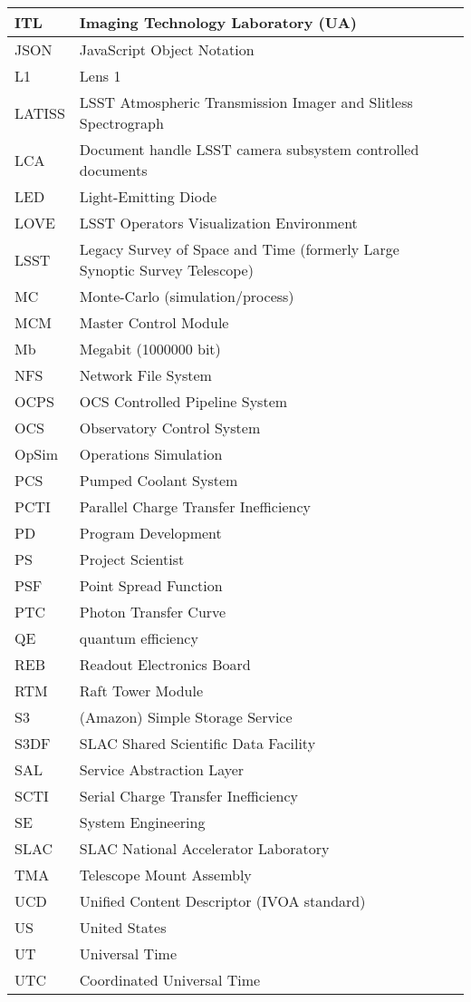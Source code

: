 \begin{longtable}{p{}p{}}
ITL & Imaging Technology Laboratory (UA) \\\hline
JSON & JavaScript Object Notation \\\hline
L1 & Lens 1 \\\hline
LATISS & LSST Atmospheric Transmission Imager and Slitless Spectrograph \\\hline
LCA & Document handle LSST camera subsystem controlled documents \\\hline
LED & Light-Emitting Diode \\\hline
LOVE & LSST Operators Visualization Environment \\\hline
LSST & Legacy Survey of Space and Time (formerly Large Synoptic Survey Telescope) \\\hline
MC & Monte-Carlo (simulation/process) \\\hline
MCM & Master Control Module \\\hline
Mb & Megabit (1000000 bit) \\\hline
NFS & Network File System \\\hline
OCPS & OCS Controlled Pipeline System \\\hline
OCS & Observatory Control System \\\hline
OpSim & Operations Simulation \\\hline
PCS & Pumped Coolant System \\\hline
PCTI & Parallel Charge Transfer Inefficiency \\\hline
PD & Program Development \\\hline
PS & Project Scientist \\\hline
PSF & Point Spread Function \\\hline
PTC & Photon Transfer Curve \\\hline
QE & quantum efficiency \\\hline
REB & Readout Electronics Board \\\hline
RTM & Raft Tower Module \\\hline
S3 & (Amazon) Simple Storage Service \\\hline
S3DF & SLAC Shared Scientific Data Facility \\\hline
SAL & Service Abstraction Layer \\\hline
SCTI & Serial Charge Transfer Inefficiency \\\hline
SE & System Engineering \\\hline
SLAC & SLAC National Accelerator Laboratory \\\hline
TMA & Telescope Mount Assembly \\\hline
UCD & Unified Content Descriptor (IVOA standard) \\\hline
US & United States \\\hline
UT & Universal Time \\\hline
UTC & Coordinated Universal Time \\\hline
\end{longtable}
